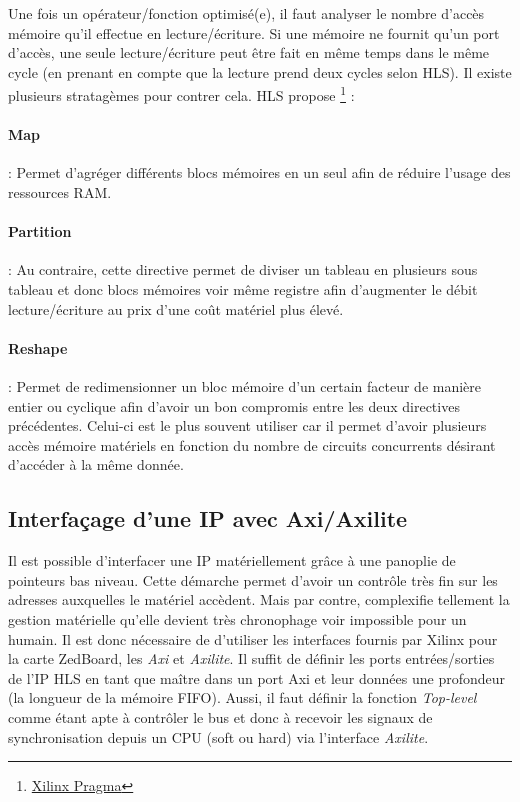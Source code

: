 \documentclass[12pt,a4paper]{ieee}
\begin{document}
Une fois un opérateur/fonction optimisé(e), il faut analyser le nombre d'accès mémoire qu'il effectue en lecture/écriture. Si une mémoire ne fournit qu'un port d'accès, une seule lecture/écriture peut être fait en même temps dans le même cycle (en prenant en compte que la lecture prend deux cycles selon HLS). Il existe plusieurs stratagèmes pour contrer cela. HLS propose \footnote{\href{https://japan.xilinx.com/html\_docs/xilinx2017\_4/sdaccel\_doc/okr1504034364623.html}{Xilinx Pragma}} :
\paragraph{Map} : Permet d'agréger différents blocs mémoires en un seul afin de réduire l'usage des ressources RAM.
\paragraph{Partition} : Au contraire, cette directive permet de diviser un tableau en plusieurs sous tableau et donc blocs mémoires voir même registre afin d'augmenter le débit lecture/écriture au prix d'une coût matériel plus élevé.
\paragraph{Reshape} : Permet de redimensionner un bloc mémoire d'un certain facteur de manière entier ou cyclique afin d'avoir un bon compromis entre les deux directives précédentes. Celui-ci est le plus souvent utiliser car il permet d'avoir plusieurs accès mémoire matériels en fonction du nombre de circuits concurrents désirant d'accéder à la même donnée.

\subsection{Interfaçage d'une IP avec Axi/Axilite}
Il est possible d'interfacer une IP matériellement grâce à une panoplie de pointeurs bas niveau. Cette démarche permet d'avoir un contrôle très fin sur les adresses auxquelles le matériel accèdent. Mais par contre, complexifie tellement la gestion matérielle qu'elle devient très chronophage voir impossible pour un humain. Il est donc nécessaire de d'utiliser les interfaces fournis par Xilinx pour la carte ZedBoard, les \textit{Axi} et \textit{Axilite}. Il suffit de définir les ports entrées/sorties de l'IP HLS en tant que maître dans un port Axi et leur données une profondeur (la longueur de la mémoire FIFO). Aussi, il faut définir la fonction \textit{Top-level} comme étant apte à contrôler le bus et donc à recevoir les signaux de synchronisation depuis un CPU (soft ou hard) via l'interface \textit{Axilite}.
\end{document}
